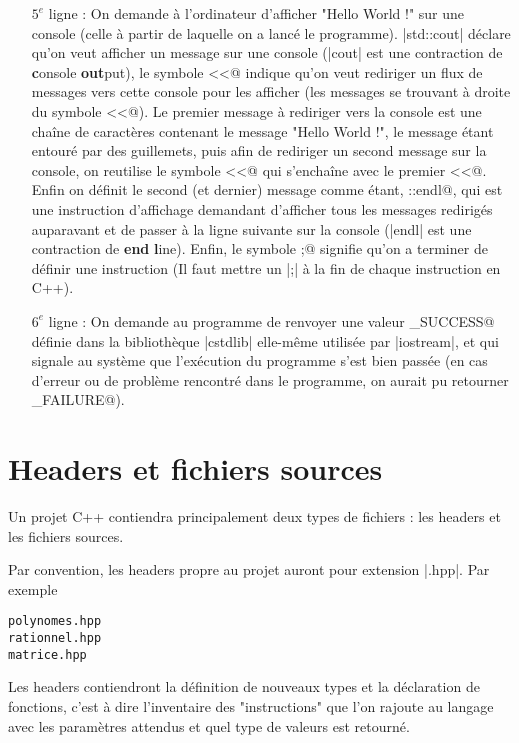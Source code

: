 \begin{itemize}
  \item [$5^{e}$ ligne] : On demande à l'ordinateur d'afficher "Hello World !" sur une console (celle à partir de laquelle on a lancé le programme). |std::cout| déclare qu'on veut afficher un message sur une console (|cout| est une contraction de \textbf{c}onsole \textbf{out}put), le symbole \verb@<<@ indique qu'on veut rediriger un flux de messages vers cette console pour les afficher (les messages se trouvant à droite du symbole \verb@<<@). Le premier message à rediriger vers la console est une chaîne de caractères contenant le message "Hello World !", le message étant entouré par des guillemets, puis afin de rediriger un second message sur la console, on reutilise le symbole \verb@<<@ qui s'enchaîne avec le premier \verb@<<@. Enfin on définit le second (et dernier) message comme étant, \verb@std::endl@, qui est une instruction d'affichage demandant d'afficher tous les messages redirigés auparavant et de passer à la ligne suivante sur la console (|endl| est une contraction de \textbf{end} \textbf{l}ine). Enfin, le symbole \verb@;@ signifie qu'on a terminer de définir une instruction (Il faut mettre un |;| à la fin de chaque instruction en C++).
  \item [$6^{e}$ ligne] : On demande au programme de renvoyer une valeur \verb@EXIT_SUCCESS@ définie dans la bibliothèque |cstdlib| elle-même utilisée par |iostream|, et qui signale au système que l'exécution du programme s'est bien passée (en cas d'erreur ou de problème rencontré dans le programme, on aurait pu retourner \verb@EXIT_FAILURE@).
\end{itemize}

\section{Headers et fichiers sources}

Un projet C++ contiendra principalement deux types de fichiers : les headers et les fichiers sources.

Par convention, les headers propre au projet auront pour extension |.hpp|. Par exemple
\begin{verbatim}
polynomes.hpp
rationnel.hpp
matrice.hpp
\end{verbatim}

Les headers contiendront la définition de nouveaux types et la déclaration de fonctions, c'est à dire l'inventaire
des "instructions" que l'on rajoute au langage avec les paramètres attendus et quel type de valeurs est retourné.

